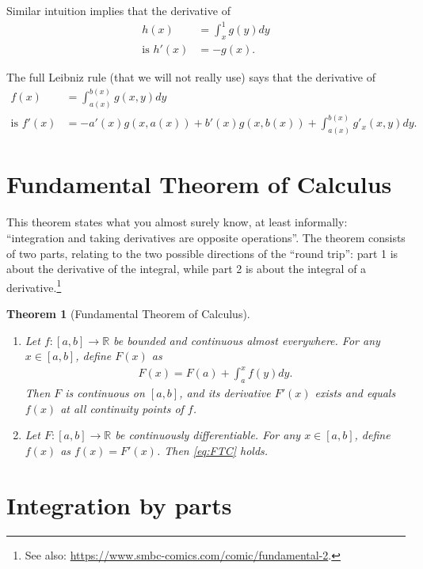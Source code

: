 \documentclass{article}
\newtheorem{theorem}{Theorem}
\begin{document}
Similar intuition implies that the derivative of
\begin{align*}
	h(x) &= \int_x^1 g(y) dy
	\\
	\text{is }
	h'(x) &= -g(x).
\end{align*}

The full Leibniz rule (that we will not really use) says that the derivative of
\begin{align*}
	f(x) &= \int_{a(x)}^{b(x)} g(x,y) dy
	\\
	\text{is } f'(x) &= -a'(x)g(x,a(x)) + b'(x) g(x,b(x)) + \int_{a(x)}^{b(x)} g'_x(x,y) dy.
\end{align*}



\section{Fundamental Theorem of Calculus}

This theorem states what you almost surely know, at least informally: ``integration and taking derivatives are opposite operations''. The theorem consists of two parts, relating to the two possible directions of the ``round trip'': part 1 is about the derivative of the integral, while part 2 is about the integral of a derivative.\footnote{See also: \url{https://www.smbc-comics.com/comic/fundamental-2}.}

\begin{theorem}[Fundamental Theorem of Calculus]
	\,
	\begin{enumerate}
		\item Let $f:[a,b] \to \mathbb{R}$ be bounded and continuous almost everywhere. For any $x \in [a,b]$, define $F(x)$ as
		\begin{align} \label{eq:FTC}
			F(x) = F(a) + \int_a^x f(y) dy.
		\end{align}
		Then $F$ is continuous on $[a,b]$, and its derivative $F'(x)$ exists and equals $f(x)$ at all continuity points of $f$.
		
		\item Let $F:[a,b] \to \mathbb{R}$ be continuously differentiable. For any $x \in [a,b]$, define $f(x)$ as $f(x)=F'(x)$. Then \eqref{eq:FTC} holds.
	\end{enumerate}
\end{theorem}




\section{Integration by parts}
\end{document}
